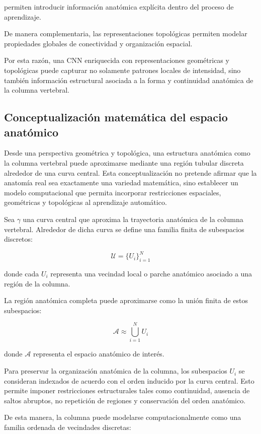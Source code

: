 \documentclass[conference]{IEEEtran}
\begin{document}
permiten introducir información anatómica explícita dentro del proceso de aprendizaje.

De manera complementaria, las representaciones topológicas permiten modelar propiedades globales de conectividad y organización espacial.

Por esta razón, una CNN enriquecida con representaciones geométricas y topológicas puede capturar no solamente patrones locales de intensidad, sino también información estructural asociada a la forma y continuidad anatómica de la columna vertebral.

\subsection{Conceptualización matemática del espacio anatómico}

Desde una perspectiva geométrica y topológica, una estructura anatómica como la columna vertebral puede aproximarse mediante una región tubular discreta alrededor de una curva central. Esta conceptualización no pretende afirmar que la anatomía real sea exactamente una variedad matemática, sino establecer un modelo computacional que permita incorporar restricciones espaciales, geométricas y topológicas al aprendizaje automático.

Sea $\gamma$ una curva central que aproxima la trayectoria anatómica de la columna vertebral. Alrededor de dicha curva se define una familia finita de subespacios discretos:

\[
\mathcal{U}=\{U_i\}_{i=1}^{N}
\]

donde cada $U_i$ representa una vecindad local o parche anatómico asociado a una región de la columna.

La región anatómica completa puede aproximarse como la unión finita de estos subespacios:

\[
\mathcal{A} \approx \bigcup_{i=1}^{N} U_i
\]

donde $\mathcal{A}$ representa el espacio anatómico de interés.

Para preservar la organización anatómica de la columna, los subespacios $U_i$ se consideran indexados de acuerdo con el orden inducido por la curva central. Esto permite imponer restricciones estructurales tales como continuidad, ausencia de saltos abruptos, no repetición de regiones y conservación del orden anatómico.

De esta manera, la columna puede modelarse computacionalmente como una familia ordenada de vecindades discretas:
\end{document}
